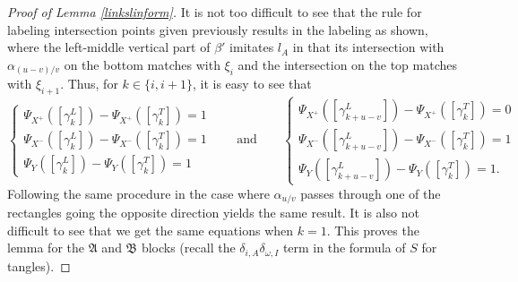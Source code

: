 \documentclass[11pt]{amsart}
\theoremstyle{plain}
\theoremstyle{definition}
\theoremstyle{remark}
\begin{document}
\begin{proof}[Proof of Lemma \ref{linkslinform}]
It is not too difficult to see that the rule for labeling intersection points given previously results in the labeling as shown, where the left-middle vertical part of $\beta'$ imitates $l_A$ in that its intersection with $\alpha_{(u-v)/v}$ on the bottom matches with $\xi_i$ and the intersection on the top matches with $\xi_{i+1}$. Thus, for $k\in\{i,i+1\}$, it is easy to see that
\[
\begin{cases}
    \Psi_{X^+}([\gamma^L_k])-\Psi_{X^+}([\gamma^T_k])=1 \\
    \Psi_{X^-}([\gamma^L_k])-\Psi_{X^-}([\gamma^T_k])=1 \\
    \Psi_{Y}([\gamma^L_k])-\Psi_{Y}([\gamma^T_k])=1
\end{cases}
\qquad
\text{and} 
\qquad
\begin{cases}
    \Psi_{X^+}([\gamma^L_{k+u-v}])-\Psi_{X^+}([\gamma^T_k])=0 \\
    \Psi_{X^-}([\gamma^L_{k+u-v}])-\Psi_{X^-}([\gamma^T_k])=1 \\
    \Psi_{Y}([\gamma^L_{k+u-v}])-\Psi_{Y}([\gamma^T_k])=1.
\end{cases}
\]
Following the same procedure in the case where $\alpha_{u/v}$ passes through one of the rectangles going the opposite direction yields the same result. It is also not difficult to see that we get the same equations when $k=1$. This proves the lemma for the $\mathfrak{A}$ and $\mathfrak{B}$ blocks (recall the $\delta_{i,A}\delta_{\omega,I}$ term in the formula of $S$ for tangles).


\end{proof}
\end{document}
